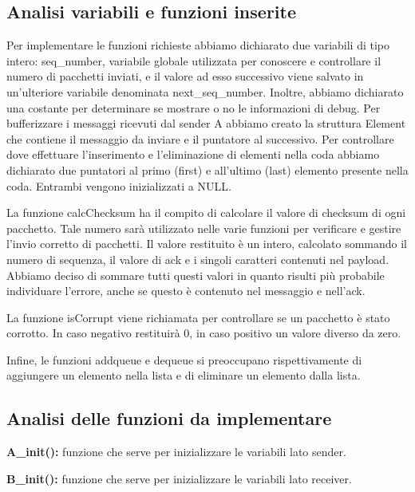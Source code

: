 \documentclass[a4paper]{article}
\begin{document}
\subsection{Analisi variabili e funzioni inserite}
Per implementare le funzioni richieste abbiamo dichiarato due variabili di tipo intero: seq\_number, variabile globale utilizzata per conoscere e controllare il numero di pacchetti inviati, e il valore ad esso successivo viene salvato in un’ulteriore variabile denominata next\_seq\_number. Inoltre, abbiamo dichiarato una costante per determinare se mostrare o no le informazioni di debug. Per bufferizzare i messaggi ricevuti dal sender A abbiamo creato la struttura Element che contiene il messaggio da inviare e il puntatore al successivo. Per controllare dove effettuare l’inserimento e l’eliminazione di elementi nella coda abbiamo dichiarato due puntatori al primo (first) e all’ultimo (last) elemento presente nella coda. Entrambi vengono inizializzati a NULL.  
\par La funzione calcChecksum ha il compito di calcolare il valore di checksum di ogni pacchetto. Tale numero sarà utilizzato nelle varie funzioni per verificare e gestire l’invio corretto di pacchetti. Il valore restituito è un intero, calcolato sommando il numero di sequenza, il valore di ack e i singoli caratteri contenuti nel payload.  Abbiamo deciso di sommare tutti questi valori in quanto risulti più probabile individuare l’errore, anche se questo è contenuto nel messaggio e nell’ack. 
\par La funzione isCorrupt viene richiamata per controllare se un pacchetto è stato corrotto. In caso negativo restituirà 0, in caso positivo un valore diverso da zero. 
\par Infine, le funzioni addqueue e dequeue si preoccupano rispettivamente di aggiungere un elemento nella lista e di eliminare un elemento dalla lista.

\subsection{Analisi delle funzioni da implementare}
\begin{flushleft}
\textbf{A\_init():} funzione che serve per inizializzare le variabili lato sender.
\end{flushleft}

\begin{flushleft}
\textbf{B\_init():} funzione che serve per inizializzare le variabili lato receiver.
\end{flushleft}
\end{document}
